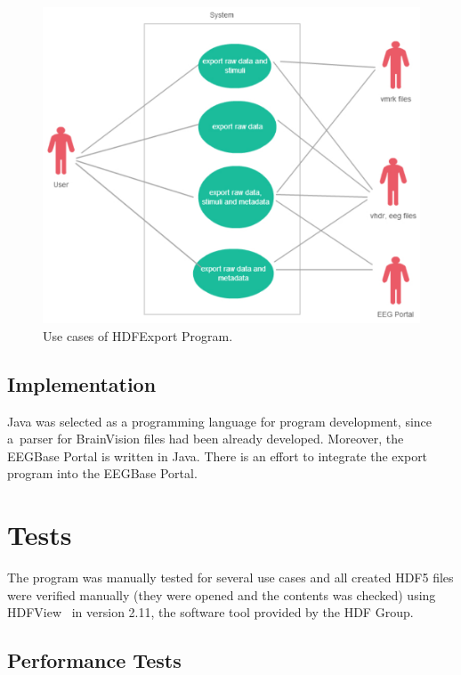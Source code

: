\documentclass[conference]{IEEEtran}
\begin{document}
\begin{figure}
	\includegraphics[scale=0.5]{obrazky/use_case_data.pdf}	
	\caption{Use cases of HDFExport Program.}
	\label{use_case2}
\end{figure}


\subsection{Implementation}

Java was selected as a programming language for program development, since a~parser for BrainVision files had been already developed. Moreover, the EEGBase Portal is written in Java. There is an effort to integrate the export program into the EEGBase Portal.

\section{Tests}

The program was manually tested for several use cases and all created HDF5 files were verified manually (they were opened and the contents was checked) using HDFView~\cite{hdfjava} in version 2.11, the software tool provided by the HDF Group.

\subsection{Performance Tests}
\end{document}
